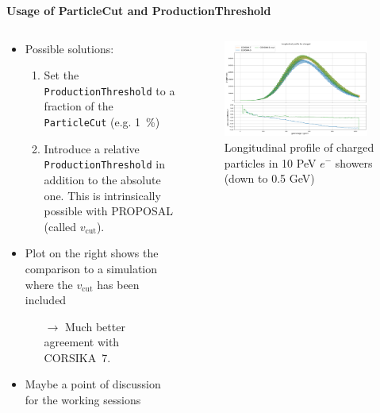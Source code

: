 \documentclass[aspectratio=1610, 9pt]{beamer}
\begin{document}
\begin{frame}

  \textbf{Usage of ParticleCut and ProductionThreshold}


    \begin{columns}[onlytextwidth]
        \begin{column}{0.45\textwidth}
            \begin{itemize}
              \item Possible solutions: 
              \begin{enumerate}
                \item Set the \texttt{ProductionThreshold} to a fraction of the \texttt{ParticleCut} (e.g. \SI{1}{\percent})
                \item Introduce a relative \texttt{ProductionThreshold} in addition to the absolute one. This is intrinsically possible with PROPOSAL (called $v_\text{cut}$).
              \end{enumerate}
              \item Plot on the right shows the comparison to a simulation where the $v_\text{cut}$ has been included
              \begin{itemize}
                \item[$\rightarrow$] Much better agreement with CORSIKA~7.
              \end{itemize}
              \item Maybe a point of discussion for the working sessions
            \end{itemize}
        \end{column}
        \begin{column}{0.55\textwidth}
            \begin{figure}
                \centering
                \includegraphics[width=0.95\textwidth]{plots/long_charged_vcut.png}
                \caption{Longitudinal profile of charged particles in 10 PeV $e^-$ showers (down to 0.5 GeV)}
            \end{figure}
        \end{column}
    \end{columns}
\end{frame}
\end{document}
